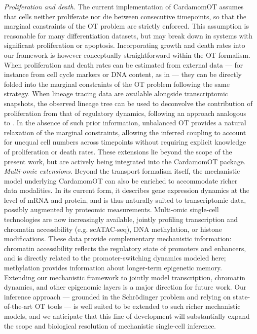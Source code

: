 \documentclass[a4paper, 11pt]{article}
\theoremstyle{plain}
\theoremstyle{remark}
\newcommand*{\firstreview}[1]{{\color{black}#1}}
\begin{document}
\textit{Proliferation and death.}
The current implementation of CardamomOT assumes that cells neither 
proliferate nor die between consecutive timepoints, so that the marginal 
constraints of the OT problem are strictly enforced. This assumption is 
reasonable for many differentiation datasets, but may break down in 
systems with significant proliferation or apoptosis. Incorporating growth 
and death rates into our framework is however conceptually straightforward 
within the \firstreview{OT} formalism. When proliferation and death rates 
can be estimated from external data — for instance from cell cycle markers 
or DNA content, as in \cite{schiebinger2019optimal} — they can be directly 
folded into the marginal constraints of the OT problem following the 
same strategy. When lineage tracing data are available alongside 
transcriptomic snapshots, the observed lineage tree can be used to 
deconvolve the contribution of proliferation from that of regulatory 
dynamics, following an approach analogous to \cite{ventre2023trajectory}. In the 
absence of such prior information, unbalanced \firstreview{OT} \cite{chizat2018scaling} 
provides a natural relaxation of the marginal constraints, allowing the 
inferred coupling to account for unequal cell numbers across timepoints 
without requiring explicit knowledge of proliferation or death rates. 
These extensions lie beyond the scope of the present work, but are 
actively being integrated into the CardamomOT package.\\

\textit{Multi-omic extensions.} Beyond the transport formalism itself, the mechanistic model underlying 
CardamomOT can also be enriched to accommodate richer data modalities. 
In its current form, it describes gene expression dynamics at the level 
of mRNA and protein, and is thus naturally suited to transcriptomic data, 
possibly augmented by proteomic measurements. Multi-omic single-cell 
technologies are now increasingly available, jointly profiling 
transcription and chromatin accessibility (e.g. scATAC-seq), DNA 
methylation, or histone modifications. These data provide complementary 
mechanistic information: chromatin accessibility reflects the regulatory 
state of promoters and enhancers, and is directly related to the 
promoter-switching dynamics modeled here; methylation provides information 
about longer-term epigenetic memory. Extending our mechanistic framework 
to jointly model transcription, chromatin dynamics, and other epigenomic 
layers is a major direction for future work. Our inference approach — 
grounded in the Schrödinger problem and relying on state-of-the-art OT 
tools — is well suited to be extended to such richer mechanistic models, 
and we anticipate that this line of development will substantially expand 
the scope and biological resolution of mechanistic single-cell inference.\\
\end{document}
